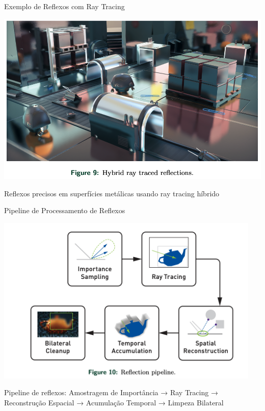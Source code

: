 \documentclass[aspectratio=169,xcolor=table]{beamer}
\begin{document}
\begin{frame}{Exemplo de Reflexos com Ray Tracing}
    \begin{center}
        \includegraphics[height=0.8\textheight]{reflections}
    \end{center}
    \begin{center}
        \small{Reflexos precisos em superfícies metálicas usando ray tracing híbrido}
    \end{center}
\end{frame}

\begin{frame}{Pipeline de Processamento de Reflexos}
    \begin{center}
        \includegraphics[width=0.95\textwidth]{reflections-pipeline}
    \end{center}
    \begin{center}
        \small{Pipeline de reflexos: Amostragem de Importância → Ray Tracing → Reconstrução Espacial → Acumulação Temporal → Limpeza Bilateral}
    \end{center}
\end{frame}
\end{document}
